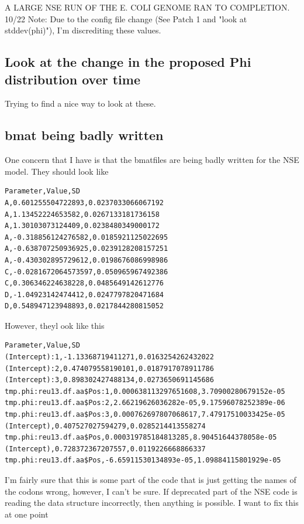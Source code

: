 A LARGE NSE RUN OF THE E. COLI GENOME RAN TO COMPLETION.
10/22 Note: Due to the config file change (See Patch 1 and "look at stddev(phi)"), I'm discrediting these values.

\subsection{Look at the change in the proposed Phi distribution over time}

Trying to find a nice way to look at these.



\subsection{bmat being badly written}

One concern that I have is that the bmatfiles are being badly written for the NSE model. They should look like 

\begin{verbatim}
Parameter,Value,SD
A,0.601255504722893,0.0237033066067192
A,1.13452224653582,0.0267133181736158
A,1.30103073124409,0.0238480349000172
A,-0.318856124276582,0.0185921125022695
A,-0.638707250936925,0.0239128208157251
A,-0.430302895729612,0.0198676086998986
C,-0.0281672064573597,0.050965967492386
C,0.306346224638228,0.0485649142612776
D,-1.04923142474412,0.0247797820471684
D,0.548947123948893,0.0217844280815052
\end{verbatim}

However, theyl ook like this

\begin{verbatim}
Parameter,Value,SD
(Intercept):1,-1.13368719411271,0.0163254262432022
(Intercept):2,0.474079558190101,0.0187917078911786
(Intercept):3,0.898302427488134,0.0273650691145686
tmp.phi:reu13.df.aa$Pos:1,0.000638113297651608,3.70900280679152e-05
tmp.phi:reu13.df.aa$Pos:2,2.66219626036282e-05,9.17596078252389e-06
tmp.phi:reu13.df.aa$Pos:3,0.000762697807068617,7.47917510033425e-05
(Intercept),0.407527027594279,0.0285214413558274
tmp.phi:reu13.df.aa$Pos,0.000319785184813285,8.90451644378058e-05
(Intercept),0.728372367207557,0.0119226668866337
tmp.phi:reu13.df.aa$Pos,-6.65911530134893e-05,1.09884115801929e-05
\end{verbatim}


I'm fairly sure that this is some part of the code that is just getting the names of the codons wrong, however, I can't be sure. If deprecated part of the NSE code is reading the data structure incorrectly, then anything is possible. I want to fix this at one point

